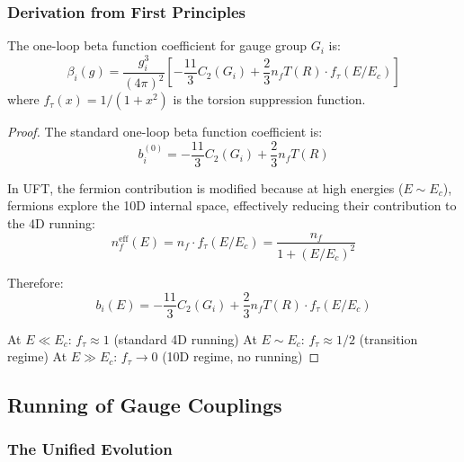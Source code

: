 \subsubsection{Derivation from First Principles}

\begin{theorem}
The one-loop beta function coefficient for gauge group $G_i$ is:
\begin{equation}
    \beta_i(g) = \frac{g_i^3}{(4\pi)^2} \left[ -\frac{11}{3}C_2(G_i) + \frac{2}{3}n_f T(R) \cdot f_\tau(E/E_c) \right]
\end{equation}
where $f_\tau(x) = 1/(1+x^2)$ is the torsion suppression function.
\end{theorem}

\begin{proof}
The standard one-loop beta function coefficient is:
\begin{equation}
    b_i^{(0)} = -\frac{11}{3}C_2(G_i) + \frac{2}{3}n_f T(R)
\end{equation}

In UFT, the fermion contribution is modified because at high energies ($E \sim E_c$), fermions explore the 10D internal space, effectively reducing their contribution to the 4D running:
\begin{equation}
    n_f^{\text{eff}}(E) = n_f \cdot f_\tau(E/E_c) = \frac{n_f}{1+(E/E_c)^2}
\end{equation}

Therefore:
\begin{equation}
    b_i(E) = -\frac{11}{3}C_2(G_i) + \frac{2}{3}n_f T(R) \cdot f_\tau(E/E_c)
\end{equation}

At $E \ll E_c$: $f_\tau \approx 1$ (standard 4D running)
At $E \sim E_c$: $f_\tau \approx 1/2$ (transition regime)
At $E \gg E_c$: $f_\tau \to 0$ (10D regime, no running)
\end{proof}

\subsection{Running of Gauge Couplings}

\subsubsection{The Unified Evolution}

